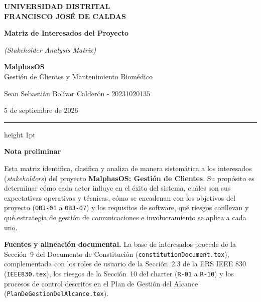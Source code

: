 \documentclass[12pt,varwidth=170mm,border=10pt]{standalone}
\newcommand{\sectiontitle}[1]{%
  \par\vspace{1.8ex}%
  {\normalfont\Large\bfseries #1\par}%
  \vspace{1.0ex}%
}
\newcommand{\ruta}[1]{\nolinkurl{#1}}
\begin{document}
\begin{center}
  {\Large\textbf{UNIVERSIDAD DISTRITAL}\\
   \textbf{FRANCISCO JOSÉ DE CALDAS}}\par

  \vspace{1.2em}

  {\Huge\textbf{Matriz de Interesados del Proyecto}}\par
  {\Large\textit{(Stakeholder Analysis Matrix)}}\par

  \vspace{1.0em}

  {\Large\textbf{MalphasOS}}\\
  {\large Gestión de Clientes y Mantenimiento Biomédico}\par

  \vspace{1.0em}

  {\large Sean Sebastián Bolívar Calderón - 20231020135}\par
  {\large 5 de septiembre de 2026}\par
\end{center}

\vspace{1.0em}
{\color{mainRed}\hrule height 1pt}
\vspace{1.5em}

\sectiontitle{Nota preliminar}

Esta matriz identifica, clasifica y analiza de manera sistemática a los interesados (\emph{stakeholders}) del proyecto \textbf{MalphasOS: Gestión de Clientes}. Su propósito es determinar cómo cada actor influye en el éxito del sistema, cuáles son sus expectativas operativas y técnicas, cómo se encadenan con los objetivos del proyecto (\texttt{OBJ-01} a \texttt{OBJ-07}) y los requisitos de software, qué riesgos conllevan y qué estrategia de gestión de comunicaciones e involucramiento se aplica a cada uno.

\textbf{Fuentes y alineación documental.} La base de interesados procede de la Sección~9 del Documento de Constitución (\ruta{constitutionDocument.tex}), complementada con los roles de usuario de la Sección~2.3 de la ERS IEEE 830 (\ruta{IEEE830.tex}), los riesgos de la Sección~10 del charter (\texttt{R-01} a \texttt{R-10}) y los procesos de control descritos en el Plan de Gestión del Alcance (\ruta{PlanDeGestionDelAlcance.tex}).
\end{document}
